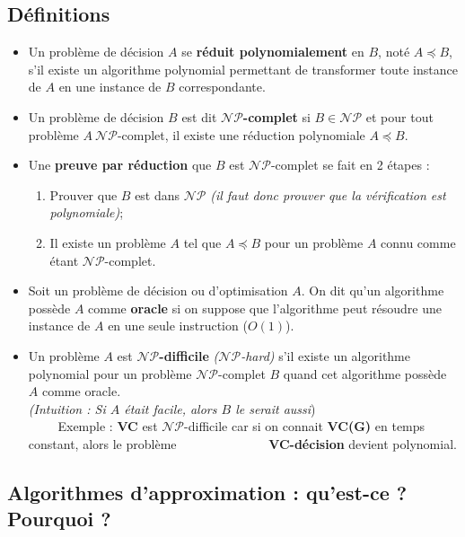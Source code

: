\documentclass[12pt]{article}
\newcommand{\quotecolor}[1]{\textcolor{quote}{#1}}
\begin{document}
\subsection*{Définitions}
\begin{itemize}
\item Un problème de décision $A$ se \textbf{réduit polynomialement} en $B$,
noté $A\preceq B$, s'il existe un algorithme polynomial permettant de
transformer toute instance de $A$ en une instance de $B$ correspondante.
\item Un problème de décision $B$ est dit \textbf{$\mathcal{NP}$-complet} si
$B \in \mathcal{NP}$ et pour tout problème $A\ \mathcal{NP}$-complet, il existe
une réduction polynomiale $A\preceq B$.
\item Une \textbf{preuve par réduction} que $B$ est $\mathcal{NP}$-complet se
fait en 2 étapes :
\begin{enumerate}
\item Prouver que $B$ est dans $\mathcal{NP}$ \textit{(il faut donc prouver que
la vérification est polynomiale)};
\item Il existe un problème $A$ tel que $A\preceq B$ pour un problème $A$ connu
comme étant $\mathcal{NP}$-complet.
\end{enumerate}
\item Soit un problème de décision ou d'optimisation $A$. On dit qu'un
algorithme possède $A$ comme \textbf{oracle} si on suppose que l'algorithme peut
résoudre une instance de $A$ en une seule instruction ($O(1)$).
\item Un problème $A$ est \textbf{$\mathcal{NP}$-difficile}
\textit{($\mathcal{NP}$-hard)} s'il existe un algorithme polynomial pour un
problème $\mathcal{NP}$-complet $B$ quand cet algorithme possède $A$ comme
oracle. \\
\textit{(Intuition : Si $A$ était facile, alors $B$ le serait aussi})\\
\indent$\qquad$ Exemple : \textbf{VC} est $\mathcal{NP}$-difficile car si on
connait \textbf{VC(G)} en temps constant, alors le problème
\indent$\qquad\qquad\qquad\quad$\textbf{VC-décision} devient polynomial.
\end{itemize}

\subsection{Algorithmes d'approximation : qu'est-ce ? Pourquoi ?}
\end{document}
